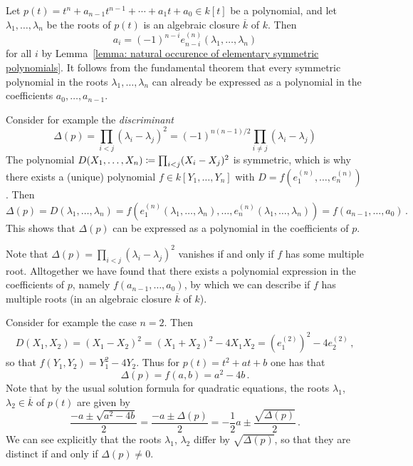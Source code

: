 \begin{example}
  Let $p(t) = t^n + a_{n-1} t^{n-1} + \dotsb + a_1 t + a_0 \in k[t]$ be a polynomial, and let $\lambda_1, \dotsc, \lambda_n$ be the roots of $p(t)$ is an algebraic closure $\overline{k}$ of $k$.
  Then
  \[
      a_i
    = (-1)^{n-i} e^{(n)}_{n-i}(\lambda_1, \dotsc, \lambda_n)
  \]
  for all $i$ by Lemma~\ref{lemma: natural occurence of elementary symmetric polynomials}.
  It follows from the fundamental theorem that every symmetric polynomial in the roots $\lambda_1, \dotsc, \lambda_n$ can already be expressed as a polynomial in the coefficients $a_0, \dotsc, a_{n-1}$.
  
  Consider for example the \emph{discriminant}
  \[
      \Delta(p)
    = \prod_{i < j} (\lambda_i - \lambda_j)^2
    = (-1)^{n(n-1)/2} \prod_{i \neq j} (\lambda_i - \lambda_j)
  \]
  The polynomial $D(X_1, \dotsc, X_n) \coloneqq \prod_{i < j} (X_i - X_j)^2$ is symmetric, which is why there exists a (unique) polynomial $f \in k[Y_1, \dotsc, Y_n]$ with $D = f(e^{(n)}_1, \dotsc, e^{(n)}_n)$.
  Then
  \[
      \Delta(p)
    = D(\lambda_1, \dotsc, \lambda_n)
    = f(e^{(n)}_1(\lambda_1, \dotsc, \lambda_n), \dotsc, e^{(n)}_n(\lambda_1, \dotsc, \lambda_n))
    = f(a_{n-1}, \dotsc, a_0) \,.
  \]
  This shows that $\Delta(p)$ can be expressed as a polynomial in the coefficients of $p$.
  
  Note that $\Delta(p) = \prod_{i < j} (\lambda_i - \lambda_j)^2$ vanishes if and only if $f$ has some multiple root.
  Alltogether we have found that there exists a polynomial expression in the coefficients of $p$, namely $f(a_{n-1}, \dotsc, a_0)$, by which we can describe if $f$ has multiple roots (in an algebraic closure $\overline{k}$ of $k$).
  
  Consider for example the case $n = 2$.
  Then
  \begin{align*}
        D(X_1, X_2)
     =  (X_1 - X_2)^2
     =  (X_1 + X_2)^2 - 4 X_1 X_2
     =  \left( e^{(2)}_1 \right)^2 - 4 e^{(2)}_2 \,,
  \end{align*}
  so that $f(Y_1, Y_2) = Y_1^2 - 4 Y_2$.
  Thus for $p(t) = t^2 + a t + b$ one has that
  \[
      \Delta(p)
    = f(a,b)
    = a^2 - 4 b \,.
  \]
  Note that by the usual solution formula for quadratic equations, the roots $\lambda_1$, $\lambda_2 \in \overline{k}$ of $p(t)$ are given by
  \[
      \frac{-a \pm \sqrt{a^2 - 4b}}{2}
    = \frac{-a \pm \Delta(p)}{2}
    = -\frac{1}{2} a \pm \frac{\sqrt{\Delta(p)}}{2} \,.
  \]
  We can see explicitly that the roots $\lambda_1$, $\lambda_2$ differ by $\sqrt{\Delta(p)}$, so that they are distinct if and only if $\Delta(p) \neq 0$.
\end{example}


